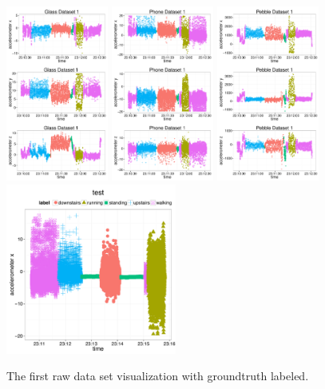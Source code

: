 \begin{figure}
  \centering
  \includegraphics[width=0.3\textwidth]{figures/eda_soda1_glass.pdf}
  \includegraphics[width=0.3\textwidth]{figures/eda_soda1_phone.pdf}
  \includegraphics[width=0.3\textwidth]{figures/eda_soda1_pebble.pdf}
  \includegraphics[width=0.5\textwidth]{figures/legend.pdf}
  \caption{The first raw data set visualization with groundtruth labeled.}
  \label{fig:soda1}
\end{figure}

